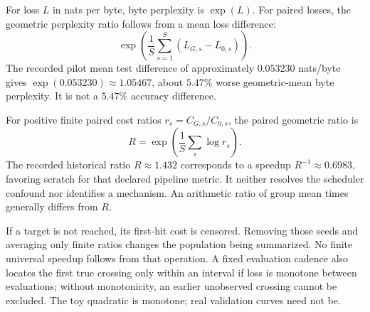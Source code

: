 For loss $L$ in nats per byte, byte perplexity is $\exp(L)$.
For paired losses, the geometric perplexity ratio follows from a mean
loss difference:
\begin{equation}
 \exp\!\left(\frac1S\sum_{s=1}^{S}(L_{G,s}-L_{0,s})\right).
\end{equation}
The recorded pilot mean test difference of approximately $0.053230$
nats/byte gives $\exp(0.053230)\approx1.05467$, about $5.47\%$ worse
geometric-mean byte perplexity. It is not a $5.47\%$ accuracy difference.

For positive finite paired cost ratios $r_s=C_{G,s}/C_{0,s}$, the
paired geometric ratio is
\begin{equation}
 R=\exp\!\left(\frac1S\sum_s\log r_s\right).
\end{equation}
The recorded historical ratio $R\approx1.432$ corresponds to a speedup
$R^{-1}\approx0.6983$, favoring scratch for that declared pipeline metric.
It neither resolves the scheduler confound nor identifies a mechanism.
An arithmetic ratio of group mean times generally differs from $R$.

If a target is not reached, its first-hit cost is censored. Removing
those seeds and averaging only finite ratios changes the population
being summarized. No finite universal speedup follows from that
operation. A fixed evaluation cadence also locates the first true
crossing only within an interval if loss is monotone between evaluations;
without monotonicity, an earlier unobserved crossing cannot be excluded.
The toy quadratic is monotone; real validation curves need not be.

